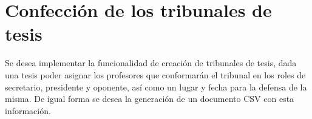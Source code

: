 \section{Confección de los tribunales de tesis}
Se desea implementar la funcionalidad de creación
de tribunales de tesis, dada una tesis poder asignar
los profesores que conformarán el tribunal en los
roles de secretario, presidente y oponente, así como
un lugar y fecha para la defensa de la misma. De igual
forma se desea la generación de un documento CSV con
esta información.
